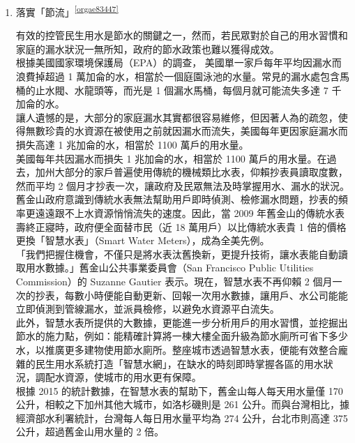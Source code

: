 \documentclass[a4paper,12pt]{article}
\begin{document}
\begin{enumerate}
\item 落實「節流」\textsuperscript{\ref{orgae83447}}
\label{sec:org211ec1c}

有效的控管民生用水是節水的關鍵之一，然而，若民眾對於自己的用水習慣和家庭的漏水狀況一無所知，政府的節水政策也難以獲得成效。\\

根據美國國家環境保護局（EPA）的調查， 美國單一家戶每年平均因漏水而浪費掉超過 1 萬加侖的水，相當於一個庭園泳池的水量。常見的漏水處包含馬桶的止水閥、水龍頭等，而光是 1 個漏水馬桶，每個月就可能流失多達 7 千加侖的水。\\

讓人遺憾的是，大部分的家庭漏水其實都很容易維修，但因著人為的疏忽，使得無數珍貴的水資源在被使用之前就因漏水而流失，美國每年更因家庭漏水而損失高達 1 兆加侖的水，相當於 1100 萬戶的用水量。\\

美國每年共因漏水而損失 1 兆加侖的水，相當於 1100 萬戶的用水量。在過去，加州大部分的家戶普遍使用傳統的機械類比水表，仰賴抄表員讀取度數，然而平均 2 個月才抄表一次，讓政府及民眾無法及時掌握用水、漏水的狀況。\\

舊金山政府意識到傳統水表無法幫助用戶即時偵測、檢修漏水問題，抄表的頻率更遠遠跟不上水資源悄悄流失的速度。因此，當 2009 年舊金山的傳統水表壽終正寢時，政府便全面替市民（近 18 萬用戶）以比傳統水表貴 1 倍的價格更換「智慧水表」（Smart Water Meters），成為全美先例。\\

「我們把握住機會，不僅只是將水表汰舊換新，更提升技術，讓水表能自動讀取用水數據。」舊金山公共事業委員會（San Francisco Public Utilities Commission）的 Suzanne Gautier 表示。現在，智慧水表不再仰賴 2 個月一次的抄表，每數小時便能自動更新、回報一次用水數據，讓用戶、水公司能能立即偵測到管線漏水，並派員檢修，以避免水資源平白流失。\\

此外，智慧水表所提供的大數據，更能進一步分析用戶的用水習慣，並挖掘出節水的施力點，例如：能精確計算將一棟大樓全面升級為節水廁所可省下多少水，以推廣更多建物使用節水廁所。整座城市透過智慧水表，便能有效整合龐雜的民生用水系統打造「智慧水網」，在缺水的時刻即時掌握各區的用水狀況，調配水資源，使城市的用水更有保障。\\

根據 2015 的統計數據，在智慧水表的幫助下，舊金山每人每天用水量僅 170 公升，相較之下加州其他大城市，如洛杉磯則是 261 公升。而與台灣相比，據經濟部水利署統計，台灣每人每日用水量平均為 274 公升，台北市則高達 375 公升，超過舊金山用水量的 2 倍。\\


\end{enumerate}
\end{document}
